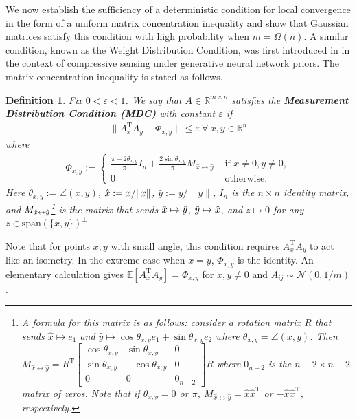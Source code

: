 \documentclass[11pt]{article}
\newcommand{\R}{\mathbb{R}}
\newcommand{\N}{\mathcal{N}}
\newcommand{\T}{\mathrm{T}}
\renewcommand{\top}{\mathrm{T}}
\renewcommand{\epsilon}{\varepsilon}
\newcommand{\E}{\mathbb{E}}
\newtheorem{definition}{Definition}
\begin{document}
We now establish the sufficiency of a deterministic condition for local convergence in the form of a uniform matrix concentration inequality and show that Gaussian matrices satisfy this condition with high probability when $m = \Omega(n)$. A similar condition, known as the Weight Distribution Condition, was first introduced in \cite{HV2017} in the context of compressive sensing under generative neural network priors. The matrix concentration inequality is stated as follows. 
 \begin{definition} Fix $0 < \epsilon < 1$. We say that $A \in \R^{m \times n}$ satisfies the \textbf{Measurement Distribution Condition (MDC)} with constant $\epsilon$ if \begin{align*}
    \|A_x^{\T}A_y - \Phi_{x,y}\|\leqslant \epsilon\ \forall\ x,y \in \R^n
\end{align*} where \begin{align}
    \Phi_{x,y}:=  \begin{cases} \frac{\pi - 2\theta_{x,y}}{\pi}I_n + \frac{2\sin \theta_{x,y}}{\pi} M_{\hat{x} \leftrightarrow \hat{y}}  & \text{ if } x\neq 0, y \neq 0, \\
    0 & \text{ otherwise.}
\end{cases} \label{Phi_def} \end{align} Here $\theta_{x,y} := \angle(x,y)$, $\Hat{x}: = x/\|x\|$, $\hat{y} := y/\|y\|$,  $I_n$ is the $n \times n$ identity matrix, and $M_{\hat{x}\leftrightarrow \Hat{y}}$\footnote{A formula for this matrix is as follows: consider a rotation matrix $R$ that sends $\hat{x} \mapsto e_1$ and $\hat{y} \mapsto \cos\theta_{x,y} e_1 + \sin\theta_{x,y} e_2$ where $\theta_{x,y} = \angle(x,y)$. Then $M_{\hat{x} \leftrightarrow \hat{y}} = R^\top \left[\begin{array}{ccc}
    \cos\theta_{x,y} & \sin\theta_{x,y} & 0  \\
     \sin \theta_{x,y} & -\cos \theta_{x,y} & 0 \\
     0 & 0 & 0_{n-2}
\end{array}\right]R$ where $0_{n-2}$ is the $n-2 \times n-2$ matrix of zeros. Note that if $\theta_{x,y} = 0$ or $\pi$, $M_{\hat{x} \leftrightarrow \hat{y}} = \hat{x}\hat{x}^\top$ or $-\hat{x}\hat{x}^\top$, respectively.} is the matrix that sends $\Hat{x} \mapsto \Hat{y}$, $\Hat{y} \mapsto \Hat{x}$, and $z \mapsto 0$ for any $z \in \text{span}(\{x,y\})^{\perp}.$
\end{definition} 

\noindent Note that for points $x,y$ with small angle, this condition requires $A_x^{\T}A_y$ to act like an isometry. In the extreme case when $x = y$, $\Phi_{x,y}$ is the identity. An elementary calculation gives $\E[A_x^{\T}A_y] = \Phi_{x,y}$ for $x,y \neq 0$ and $A_{ij} \sim \N(0,1/m)$. 
\end{document}
